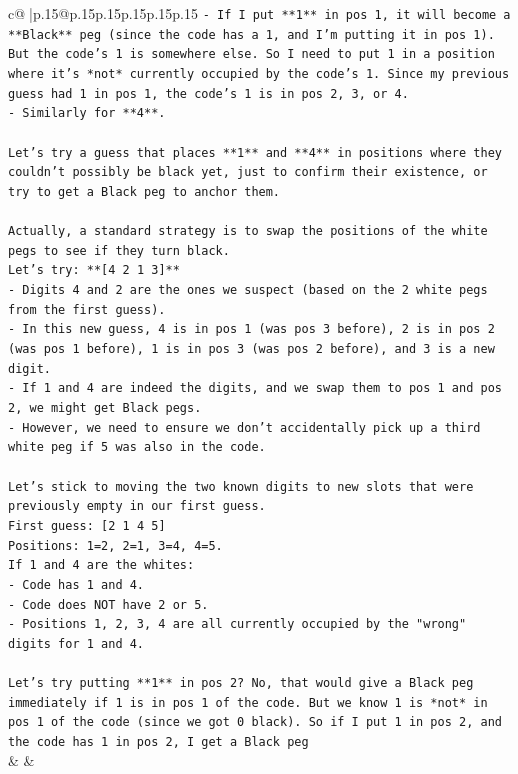 \documentclass{article}
\begin{document}
{\begin{supertabular}{c@{$\;$}|p{.15\linewidth}@{}p{.15\linewidth}p{.15\linewidth}p{.15\linewidth}p{.15\linewidth}p{.15\linewidth}}
{{{\texttt{{-} If I put **1** in pos 1, it will become a **Black** peg (since the code has a 1, and I'm putting it in pos 1). But the code's 1 is somewhere else. So I need to put 1 in a position where it's *not* currently occupied by the code's 1. Since my previous guess had 1 in pos 1, the code's 1 is in pos 2, 3, or 4.} \\
\texttt{{-} Similarly for **4**.} \\
\\ 
\texttt{Let's try a guess that places **1** and **4** in positions where they couldn't possibly be black yet, just to confirm their existence, or try to get a Black peg to anchor them.} \\
\\ 
\texttt{Actually, a standard strategy is to swap the positions of the white pegs to see if they turn black.} \\
\texttt{Let's try: **{[}4 2 1 3{]}**} \\
\texttt{{-} Digits 4 and 2 are the ones we suspect (based on the 2 white pegs from the first guess).} \\
\texttt{{-} In this new guess, 4 is in pos 1 (was pos 3 before), 2 is in pos 2 (was pos 1 before), 1 is in pos 3 (was pos 2 before), and 3 is a new digit.} \\
\texttt{{-} If 1 and 4 are indeed the digits, and we swap them to pos 1 and pos 2, we might get Black pegs.} \\
\texttt{{-} However, we need to ensure we don't accidentally pick up a third white peg if 5 was also in the code.} \\
\\ 
\texttt{Let's stick to moving the two known digits to new slots that were previously empty in our first guess.} \\
\texttt{First guess: {[}2 1 4 5{]}} \\
\texttt{Positions: 1=2, 2=1, 3=4, 4=5.} \\
\texttt{If 1 and 4 are the whites:} \\
\texttt{{-} Code has 1 and 4.} \\
\texttt{{-} Code does NOT have 2 or 5.} \\
\texttt{{-} Positions 1, 2, 3, 4 are all currently occupied by the "wrong" digits for 1 and 4.} \\
\\ 
\texttt{Let's try putting **1** in pos 2? No, that would give a Black peg immediately if 1 is in pos 1 of the code. But we know 1 is *not* in pos 1 of the code (since we got 0 black). So if I put 1 in pos 2, and the code has 1 in pos 2, I get a Black peg} \\
            }
        }
    }
    & & \\ \\


\end{supertabular}}
\end{document}
